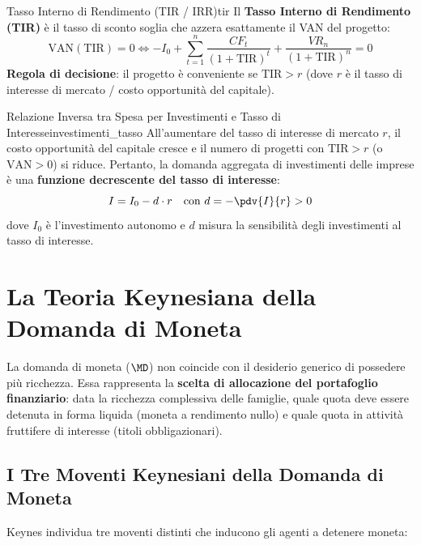 \begin{definizione}{Tasso Interno di Rendimento (TIR / IRR)}{tir}
Il \textbf{Tasso Interno di Rendimento (TIR)} è il tasso di sconto soglia che azzera esattamente il VAN del progetto:
\begin{equation}
    \mathrm{VAN}(\mathrm{TIR}) = 0 \iff -I_0 + \sum_{t=1}^n \frac{CF_t}{(1 + \mathrm{TIR})^t} + \frac{VR_n}{(1 + \mathrm{TIR})^n} = 0
\end{equation}
\textbf{Regola di decisione}: il progetto è conveniente se $\mathrm{TIR} > r$ (dove $r$ è il tasso di interesse di mercato / costo opportunità del capitale).
\end{definizione}

\begin{legge}{Relazione Inversa tra Spesa per Investimenti e Tasso di Interesse}{investimenti_tasso}
All'aumentare del tasso di interesse di mercato $r$, il costo opportunità del capitale cresce e il numero di progetti con $\mathrm{TIR} > r$ (o $\mathrm{VAN} > 0$) si riduce. Pertanto, la domanda aggregata di investimenti delle imprese è una \textbf{funzione decrescente del tasso di interesse}:
\begin{equation}
    I = I_0 - d \cdot r \quad \text{con } d = -\pdv{I}{r} > 0
\end{equation}
dove $I_0$ è l'investimento autonomo e $d$ misura la sensibilità degli investimenti al tasso di interesse.
\end{legge}

\section{La Teoria Keynesiana della Domanda di Moneta}

\begin{osservazione}
La domanda di moneta ($\MD$) non coincide con il desiderio generico di possedere più ricchezza. Essa rappresenta la \textbf{scelta di allocazione del portafoglio finanziario}: data la ricchezza complessiva delle famiglie, quale quota deve essere detenuta in forma liquida (moneta a rendimento nullo) e quale quota in attività fruttifere di interesse (titoli obbligazionari).
\end{osservazione}

\subsection{I Tre Moventi Keynesiani della Domanda di Moneta}
Keynes individua tre moventi distinti che inducono gli agenti a detenere moneta:

